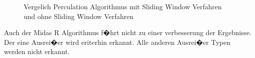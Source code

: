 \begin{figure}[h]
	\centering
	\caption{Vergelich Perculation Algorithmus mit Sliding Window Verfahren und ohne Sliding Window Verfahren}
	\label{img:midasTSresults}
\end{figure}

Auch der Midas R Algorithmus f�hrt nicht zu einer verbesserung der Ergebnisse. Der eine Ausrei�er wird eriterhin erkannt. Alle anderen Ausrei�er Typen werden nicht erkannt. 

